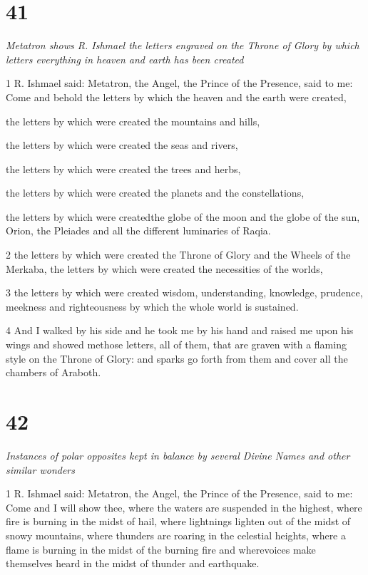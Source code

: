 \chapter{41}

\par \textit{Metatron shows R. Ishmael the letters engraved on the Throne of Glory by which letters everything in heaven and earth has been created}

\par 1 R. Ishmael said: Metatron, the Angel, the Prince of the Presence, said to me: Come and behold the letters by which the heaven and the earth were created, 
\par the letters by which were created the mountains and hills, 
\par the letters by which were created the seas and rivers, 
\par the letters by which were created the trees and herbs, 
\par the letters by which were created the planets and the constellations, 
\par the letters by which were createdthe globe of the moon and the globe of the sun, Orion, the Pleiades and all the different luminaries of Raqia. 

\par 2 the letters by which were created the Throne of Glory and the Wheels of the Merkaba, the letters by which were created the necessities of the worlds, 

\par 3 the letters by which were created wisdom, understanding, knowledge, prudence, meekness and righteousness by which the whole world is sustained. 

\par 4 And I walked by his side and he took me by his hand and raised me upon his wings and showed methose letters, all of them, that are graven with a flaming style on the Throne of Glory: and sparks go forth from them and cover all the chambers of Araboth. 


\chapter{42}

\par \textit{Instances of polar opposites kept in balance by several Divine Names and other similar wonders}

\par 1 R. Ishmael said: Metatron, the Angel, the Prince of the Presence, said to me: Come and I will show thee, where the waters are suspended in the highest, where fire is burning in the midst of hail, where lightnings lighten out of the midst of snowy mountains, where thunders are roaring in the celestial heights, where a flame is burning in the midst of the burning fire and wherevoices make themselves heard in the midst of thunder and earthquake. 

